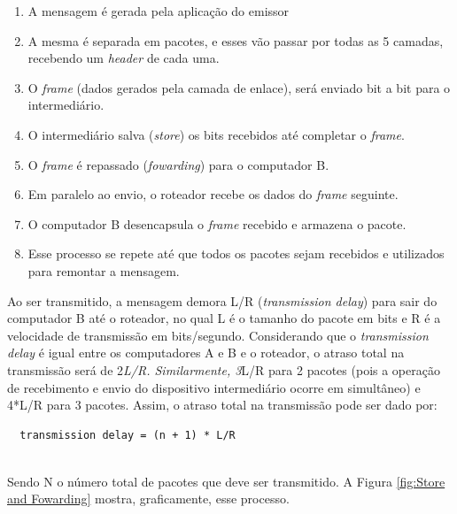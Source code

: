 \begin{enumerate}
\def\labelenumi{\arabic{enumi}.}
\tightlist
\item
  A mensagem é gerada pela aplicação do emissor
\item
  A mesma é separada em pacotes, e esses vão passar por todas as 5
  camadas, recebendo um \emph{header} de cada uma.
\item
  O \emph{frame} (dados gerados pela camada de enlace), será enviado bit
  a bit para o intermediário.
\item
  O intermediário salva (\emph{store}) os bits recebidos até completar o
  \emph{frame}.
\item
  O \emph{frame} é repassado (\emph{fowarding}) para o computador B.
\item
  Em paralelo ao envio, o roteador recebe os dados do \emph{frame}
  seguinte.
\item
  O computador B desencapsula o \emph{frame} recebido e armazena o
  pacote.
\item
  Esse processo se repete até que todos os pacotes sejam recebidos e
  utilizados para remontar a mensagem.
\end{enumerate}

Ao ser transmitido, a mensagem demora L/R (\emph{transmission delay})
para sair do computador B até o roteador, no qual L é o tamanho do
pacote em bits e R é a velocidade de transmissão em bits/segundo.
Considerando que o \emph{transmission delay} é igual entre os
computadores A e B e o roteador, o atraso total na transmissão será de
2\emph{L/R. Similarmente, 3}L/R para 2 pacotes (pois a operação de
recebimento e envio do dispositivo intermediário ocorre em simultâneo) e
4*L/R para 3 pacotes. Assim, o atraso total na transmissão pode ser dado
por:

\begin{verbatim}
  transmission delay = (n + 1) * L/R
  
\end{verbatim}

Sendo N o número total de pacotes que deve ser transmitido. A Figura \ref{fig:Store and Fowarding}
mostra, graficamente, esse processo.

